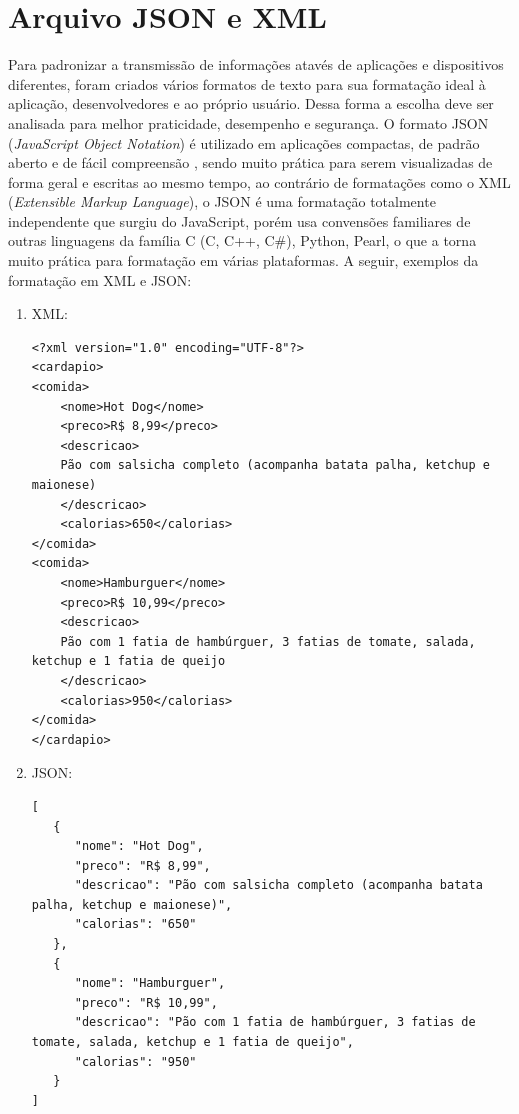 \documentclass[../../layout.tex]{subfiles}
\begin{document}
\section{Arquivo JSON e XML}
\hspace*{3em}Para padronizar a transmissão de informações atavés de aplicações e dispositivos diferentes, foram criados vários formatos de texto para sua formatação ideal à aplicação, desenvolvedores e ao próprio usuário. Dessa forma a escolha deve ser analisada para melhor praticidade, desempenho e segurança. O formato JSON (\textit{JavaScript Object Notation}) é utilizado em aplicações compactas, de padrão aberto e de fácil compreensão , sendo muito prática para serem visualizadas de forma geral e escritas ao mesmo tempo, ao contrário de formatações como o XML (\textit{Extensible Markup Language}), o JSON é uma formatação totalmente independente que surgiu do JavaScript, porém usa convensões familiares de outras linguagens da família C (C, C++, C#), Python, Pearl, o que a torna muito prática para formatação em várias plataformas. A seguir, exemplos da formatação em XML e JSON:
\begin{enumerate}[label=\alph*)]
\itemsep0em
  \item XML:
    \begin{verbatim}
<?xml version="1.0" encoding="UTF-8"?>
<cardapio>
<comida>
    <nome>Hot Dog</nome>
    <preco>R$ 8,99</preco>
    <descricao>
   	Pão com salsicha completo (acompanha batata palha, ketchup e maionese)
   	</descricao>
    <calorias>650</calorias>
</comida>
<comida>
    <nome>Hamburguer</nome>
    <preco>R$ 10,99</preco>
    <descricao>
    Pão com 1 fatia de hambúrguer, 3 fatias de tomate, salada, ketchup e 1 fatia de queijo
    </descricao>
    <calorias>950</calorias>
</comida>
</cardapio>
    \end{verbatim}
  
  \item JSON:
    \begin{verbatim}
[
   {
      "nome": "Hot Dog",
      "preco": "R$ 8,99",
      "descricao": "Pão com salsicha completo (acompanha batata palha, ketchup e maionese)",
      "calorias": "650"
   },
   {
      "nome": "Hamburguer",
      "preco": "R$ 10,99",
      "descricao": "Pão com 1 fatia de hambúrguer, 3 fatias de tomate, salada, ketchup e 1 fatia de queijo",
      "calorias": "950"
   }
]
    \end{verbatim}
\end{enumerate}
\end{document}

